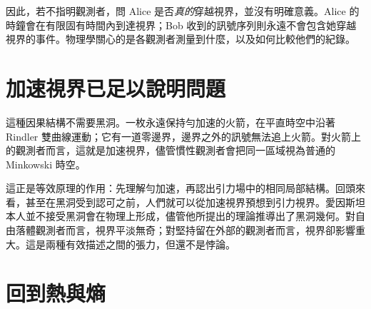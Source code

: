 \begin{classroomqa}
\end{classroomqa}

因此，若不指明觀測者，問 Alice 是否\emph{真的}穿越視界，並沒有明確意義。Alice 的時鐘會在有限固有時間內到達視界；Bob 收到的訊號序列則永遠不會包含她穿越視界的事件。物理學關心的是各觀測者測量到什麼，以及如何比較他們的紀錄。

\begin{classroomqa}
\end{classroomqa}

\section{加速視界已足以說明問題}

這種因果結構不需要黑洞。一枚永遠保持勻加速的火箭，在平直時空中沿著 Rindler 雙曲線運動；它有一道零邊界，邊界之外的訊號無法追上火箭。對火箭上的觀測者而言，這就是加速視界，儘管慣性觀測者會把同一區域視為普通的 Minkowski 時空。

\begin{classroomqa}
\end{classroomqa}

這正是等效原理的作用：先理解勻加速，再認出引力場中的相同局部結構。回頭來看，甚至在黑洞受到認可之前，人們就可以從加速視界預想到引力視界。愛因斯坦本人並不接受黑洞會在物理上形成，儘管他所提出的理論推導出了黑洞幾何。對自由落體觀測者而言，視界平淡無奇；對堅持留在外部的觀測者而言，視界卻影響重大。這是兩種有效描述之間的張力，但還不是悖論。

\section{回到熱與熵}

